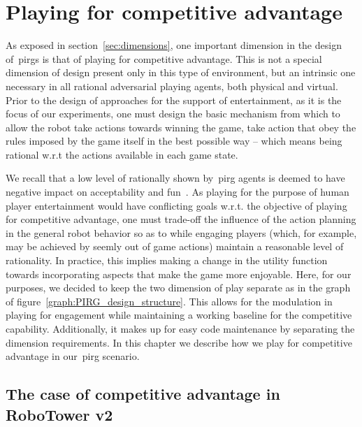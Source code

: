 \chapter{Playing for competitive advantage}

As exposed in section~\ref{sec:dimensions}, one important dimension in the design of~\gls{pirg}s is that of playing for competitive advantage. This is not a special dimension of design present only in this type of environment, but an intrinsic one necessary in all rational adversarial playing agents, both physical and virtual. Prior to the design of approaches for the support of entertainment, as it is the focus of our experiments, one must design the basic mechanism from which to allow the robot take actions towards winning the game, \ie take action that obey the rules imposed by the game itself in the best possible way -- which means being rational w.r.t the actions available in each game state. 

We recall that a low level of rationally shown by~\gls{pirg} agents is deemed to have negative impact on acceptability and fun~\citep{martinoia_physically_2013}. As playing for the purpose of human player entertainment would have conflicting goals w.r.t. the objective of playing for competitive advantage, one must trade-off the influence of the action planning in the general robot behavior so as to while engaging players (which, for example, may be achieved by seemly out of game actions) maintain a reasonable level of rationality. In practice, this implies making a change in the utility function towards incorporating aspects that make the game more enjoyable. Here, for our purposes, we decided to keep the two dimension of play separate as in the graph of figure~\ref{graph:PIRG_design_structure}. This allows for the modulation in playing for engagement while maintaining a working baseline for the competitive capability. Additionally, it makes up for easy code maintenance by separating the dimension requirements.  In this chapter we describe how we play for competitive advantage in our~\gls{pirg} scenario.

\section{The case of competitive advantage in RoboTower v2}

